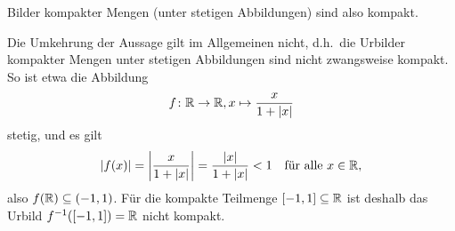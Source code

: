 \documentclass[a4paper,10pt]{article}
\begin{document}
Bilder kompakter Mengen (unter stetigen Abbildungen) sind also kompakt.


\begin{bem}
 Die Umkehrung der Aussage gilt im Allgemeinen nicht, d.h.\ die Urbilder kompakter Mengen unter stetigen Abbildungen sind nicht zwangsweise kompakt. So ist etwa die Abbildung
 \[
  f \colon \mathbb{R} \to \mathbb{R}, x \mapsto \frac{x}{1+|x|}
 \]
 stetig, und es gilt
 \[
  |f(x)|
  = \left| \frac{x}{1+|x|} \right|
  = \frac{|x|}{1+|x|}
  < 1
  \quad
  \text{für alle $x \in \mathbb{R}$},
 \]
 also $f(\mathbb{R}) \subseteq (-1,1)$. Für die kompakte Teilmenge $[-1,1] \subseteq \mathbb{R}$ ist deshalb das Urbild $f^{-1}([-1,1]) = \mathbb{R}$ nicht kompakt.
\end{bem}
\end{document}
